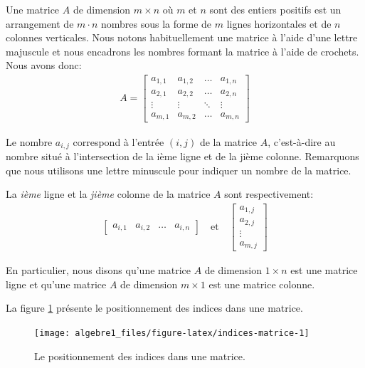 \documentclass[]{book}
\theoremstyle{definition}
\theoremstyle{definition}
\theoremstyle{definition}
\theoremstyle{remark}
\let\BeginKnitrBlock\begin \let\EndKnitrBlock\end
\begin{document}
\BeginKnitrBlock{definition}[Une matrice]
\protect\hypertarget{def:unnamed-chunk-42}{}{\label{def:unnamed-chunk-42} {} }Une matrice \(A\) de dimension \(m \times n\) où \(m\) et \(n\) sont des entiers positifs est un arrangement de \(m\cdot n\) nombres sous la forme de \(m\) lignes horizontales et de \(n\) colonnes verticales. Nous notons habituellement une matrice à l'aide d'une lettre majuscule et nous encadrons les nombres formant la matrice à l'aide de crochets. Nous avons donc:
\begin{align*}
A = \begin{bmatrix}
a_{1,1}&a_{1,2}&\ldots &a_{1,n} \\
a_{2,1}&a_{2,2}&\ldots &a_{2,n}\\
\vdots &\vdots & \ddots &\vdots \\
a_{m,1}&a_{m,2}&\ldots &a_{m,n}
\end{bmatrix}
\end{align*}

Le nombre \(a_{i,j}\) correspond à l'entrée \((i,j)\) de la matrice \(A\), c'est-à-dire au nombre situé à l'intersection de la ième ligne et de la jième colonne. Remarquons que nous utilisons une lettre minuscule pour indiquer un nombre de la matrice.

La \emph{ième} ligne et la \emph{jième} colonne de la matrice \(A\) sont respectivement:
\begin{align*}
\begin{bmatrix}
a_{i,1} & a_{i,2} & \ldots & a_{i,n}
\end{bmatrix}
\quad 
\text{et}
\quad
\begin{bmatrix}
a_{1,j} \\
a_{2,j} \\
\vdots \\
a_{m,j}
\end{bmatrix}
\end{align*}

En particulier, nous disons qu'une matrice \(A\) de dimension \(1\times n\) est une matrice ligne et qu'une matrice \(A\) de dimension \(m\times 1\) est une matrice colonne.
\EndKnitrBlock{definition}

La figure \ref{fig:indices-matrice} présente le positionnement des indices dans une matrice.

\begin{figure}

{\centering \texttt{[image: algebre1\_files/figure-latex/indices-matrice-1]} 

}

\caption{Le positionnement des indices dans une matrice.}\label{fig:indices-matrice}
\end{figure}
\end{document}
